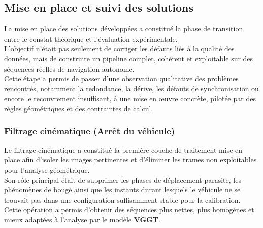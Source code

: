 \documentclass[12pt,a4paper,oneside]{report}
\begin{document}
\newpage

\subsection{Mise en place et suivi des solutions}

\hspace*{0.3cm}La mise en place des solutions développées a constitué la phase de transition entre le constat théorique et l'évaluation expérimentale.\\

\hspace*{.3cm}L'objectif n'était pas seulement de corriger les défauts liés à la qualité des données, mais de construire un pipeline complet, cohérent et exploitable sur des séquences réelles de navigation autonome.\\
\hspace*{.3cm}Cette étape a permis de passer d'une observation qualitative des problèmes rencontrés, notamment la redondance, la dérive, les défauts de synchronisation ou encore le recouvrement insuffisant, à une mise en œuvre concrète, pilotée par des règles géométriques et des contraintes de calcul.

\par\bigskip
\par\bigskip

\subsubsection{Filtrage cinématique (Arrêt du véhicule)}

\hspace*{.3cm}Le filtrage cinématique a constitué la première couche de traitement mise en place afin d'isoler les images pertinentes et d'éliminer les trames non exploitables pour l'analyse géométrique.\\

\hspace*{.3cm}Son rôle principal était de supprimer les phases de déplacement parasite, les phénomènes de bougé ainsi que les instants durant lesquels le véhicule ne se trouvait pas dans une configuration suffisamment stable pour la calibration.\\
\hspace*{.3cm}Cette opération a permis d'obtenir des séquences plus nettes, plus homogènes et mieux adaptées à l'analyse par le modèle \textbf{VGGT}.

\par\bigskip
\par\bigskip
\end{document}
